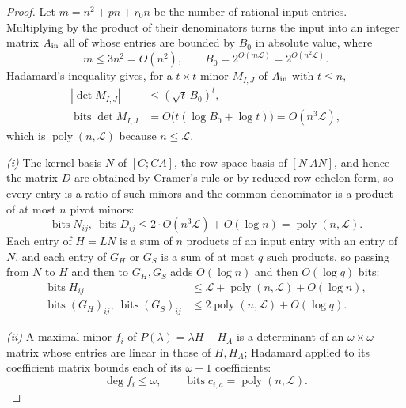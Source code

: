 \documentclass[journal]{IEEEtran}
\theoremstyle{plainn}
\theoremstyle{remark}
\begin{document}
\begin{proof}
Let $m=n^2+pn+r_0n$ be the number of rational input entries. Multiplying by the
product of their denominators turns the input into an integer matrix
$A_{\rm in}$ all of whose entries are bounded by $B_0$ in absolute value, where
\begin{equation*}
m\le3n^2=O(n^2),\qquad B_0=2^{O(m\mathcal L)}=2^{O(n^2\mathcal L)} .
\end{equation*}
Hadamard's inequality gives, for a $t\times t$ minor $M_{I,J}$ of $A_{\rm in}$
with $t\le n$,
\begin{equation*}
\begin{aligned}
|\det M_{I,J}|&\le(\sqrt t\,B_0)^t,\\
\operatorname{bits}\det M_{I,J}
&=O\bigl(t(\log B_0+\log t)\bigr)=O(n^3\mathcal L),
\end{aligned}
\end{equation*}
which is $\operatorname{poly}(n,\mathcal L)$ because $n\le\mathcal L$.

\emph{(i)} The kernel basis $N$ of $[C;CA]$, the row-space basis of $[N\ AN]$,
and hence the matrix $D$ are obtained by Cramer's rule or by reduced row echelon
form, so every entry is a ratio of such minors and the common denominator is a
product of at most $n$ pivot minors:
\begin{equation*}
\operatorname{bits}N_{ij},\ \operatorname{bits}D_{ij}
\le 2\cdot O(n^3\mathcal L)+O(\log n)=\operatorname{poly}(n,\mathcal L).
\end{equation*}
Each entry of $H=LN$ is a sum of $n$ products of an input entry with an entry of
$N$, and each entry of $G_H$ or $G_S$ is a sum of at most $q$ such products, so
passing from $N$ to $H$ and then to $G_H,G_S$ adds $O(\log n)$ and then
$O(\log q)$ bits:
\begin{equation*}
\begin{aligned}
\operatorname{bits}H_{ij}&\le\mathcal L+\operatorname{poly}(n,\mathcal L)+O(\log n),\\
\operatorname{bits}(G_H)_{ij},\ \operatorname{bits}(G_S)_{ij}
&\le2\operatorname{poly}(n,\mathcal L)+O(\log q).
\end{aligned}
\end{equation*}

\emph{(ii)} A maximal minor $f_i$ of $P(\lambda)=\lambda H-H_A$ is a determinant
of an $\omega\times\omega$ matrix whose entries are linear in those of $H,H_A$;
Hadamard applied to its coefficient matrix bounds each of its $\omega+1$
coefficients:
\begin{equation*}
\deg f_i\le\omega,\qquad
\operatorname{bits}c_{i,a}=\operatorname{poly}(n,\mathcal L).
\end{equation*}


\end{proof}
\end{document}
